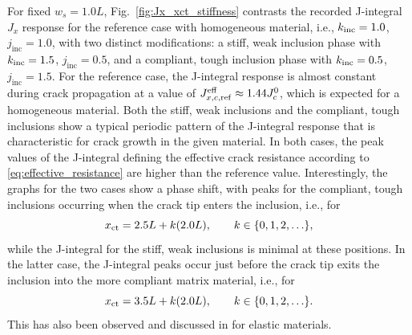 \documentclass[pamm,a4paper,fleqn]{w-art}
\newcommand{\Kinc}{k_{\rm inc}}
\newcommand{\Jinc}{j_{\text{inc}}}
\begin{document}
For fixed \(w_s=1.0L\), Fig.~\ref{fig:Jx_xct_stiffness} contrasts the
recorded J-integral \(J_x\) response for the reference case with
homogeneous material, i.e., \(\Kinc=1.0\), \(\Jinc=1.0\),
with two distinct modifications: a stiff, weak inclusion phase with
\(\Kinc=1.5\), \(\Jinc=0.5\), and a compliant, tough inclusion phase
with \(\Kinc=0.5\), \(\Jinc=1.5\).
For the reference case, the J-integral response is almost constant
during crack propagation at a value of
\(J_{x,c,\rm ref}^{\rm eff}\approx1.44J_c^0\),
which is expected for a homogeneous material.
Both the stiff, weak inclusions and the compliant, tough inclusions
show a typical periodic pattern of the J-integral response that is
characteristic for crack growth in the given material.
In both cases, the peak values of the J-integral defining the
effective crack resistance according to
\eqref{eq:effective_resistance} are higher than the reference value.
Interestingly, the graphs for the two cases show a phase shift, with
peaks for the compliant, tough inclusions occurring when the crack
tip enters the inclusion, i.e., for
\[
  x_{\rm ct}=2.5L+k(2.0L),\qquad k\in\{0,1,2,\ldots\},
\]
while the J-integral for the stiff, weak inclusions is minimal at
these positions. In the latter case, the J-integral peaks occur just
before the crack tip exits the inclusion into the more compliant
matrix material, i.e., for
\[
  x_{\rm ct}=3.5L+k(2.0L),\qquad k\in\{0,1,2,\ldots\}.
\]
This has also been observed and
discussed in \cite{kuhn_discussion_2016} for elastic materials.







\end{document}
